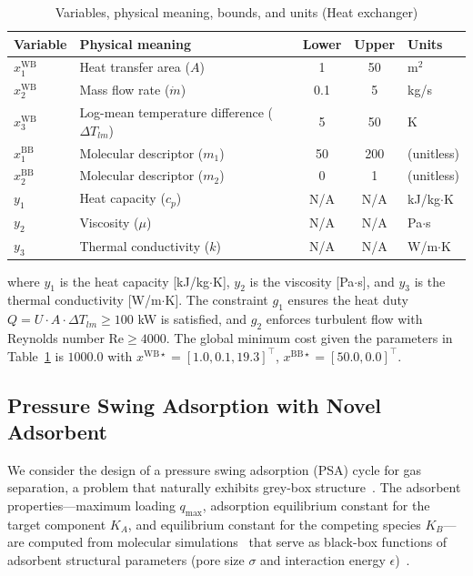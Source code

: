 \documentclass[12pt,a4paper]{article}%
\theoremstyle{plain}%
\theoremstyle{remark}%
\theoremstyle{definition}%
\def\WB{\mathrm{WB}}
\def\BB{\mathrm{BB}}
\begin{document}
\begin{appendices}
\begin{table}[htbp]
\centering
\caption{Variables, physical meaning, bounds, and units (Heat exchanger)}
\label{tab:heat_exchanger_vars}
\begin{tabular}{@{}llccl@{}}
\toprule
Variable & Physical meaning & Lower & Upper & Units \\
\midrule
$x^{\WB}_1$ & Heat transfer area ($A$) & 1 & 50 & m$^2$ \\
$x^{\WB}_2$ & Mass flow rate ($\dot{m}$) & 0.1 & 5 & kg/s \\
$x^{\WB}_3$ & Log-mean temperature difference ($\Delta T_{lm}$) & 5 & 50 & K \\
\midrule
$x^{\BB}_1$ & Molecular descriptor ($m_1$) & 50 & 200 & (unitless) \\
$x^{\BB}_2$ & Molecular descriptor ($m_2$) & 0 & 1 & (unitless) \\
\midrule
$y_1$ & Heat capacity ($c_p$) & N/A & N/A & kJ/kg$\cdot$K \\
$y_2$ & Viscosity ($\mu$) & N/A & N/A & Pa$\cdot$s \\
$y_3$ & Thermal conductivity ($k$) & N/A & N/A & W/m$\cdot$K \\
\bottomrule
\end{tabular}
\end{table}

where $y_1$ is the heat capacity [kJ/kg$\cdot$K], $y_2$ is the viscosity [Pa$\cdot$s], and $y_3$ is the thermal conductivity [W/m$\cdot$K]. The constraint $g_1$ ensures the heat duty $Q = U \cdot A \cdot \Delta T_{lm} \geq 100$ kW is satisfied, and $g_2$ enforces turbulent flow with Reynolds number $\text{Re} \geq 4000$. The global minimum cost given the parameters in Table~\ref{tab:heat_exchanger_vars} is $1000.0$ with $x^{\WB\star} = [1.0, 0.1, 19.3]^\top$, $x^{\BB\star} = [50.0, 0.0]^\top$.

\subsection{Pressure Swing Adsorption with Novel Adsorbent}\label{subsec:app_psa}

We consider the design of a pressure swing adsorption (PSA) cycle for gas separation, a problem that naturally exhibits grey-box structure~\cite{boukouvala2017argonaut,agarwal2010superstructure,ruthven1994psa}. The adsorbent properties---maximum loading $q_{\max}$, adsorption equilibrium constant for the target component $K_A$, and equilibrium constant for the competing species $K_B$---are computed from molecular simulations~\cite{burns2020process,smit2008molecular} that serve as black-box functions of adsorbent structural parameters (pore size $\sigma$ and interaction energy $\epsilon$)~\cite{dubbeldam2019force}.


\end{appendices}
\end{document}
